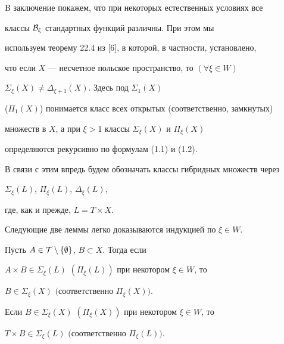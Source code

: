  


B заключение покажем, что при некоторых естественных условиях все 


классы $\cal B_\xi$ стандартных функций различны. При этом мы 


используем теорему 22.4 из [6], в которой, в частности, установлено, 


что если $X$ --- несчетное польское пространство, то $(\forall \xi\in W)$ 


$\Sigma_\xi(X)\ne\Delta_{\xi+1}(X)$. Здесь под $\Sigma_1(X)$ 


($\Pi_1(X)$) понимается класс всех открытых (соответственно, замкнутых) 


множеств в $X$, а при $\xi>1$ классы $\Sigma_\xi(X)$ и $\Pi_\xi(X)$ 


определяются рекурсивно по формулам (1.1) и (1.2). 


 


В связи с этим впредь будем обозначать классы гибридных множеств через 


$\Sigma_\xi(L)$, $\Pi_\xi(L)$, $\Delta_\xi(L)$, 


где, как и прежде, $L=T\times X$. 


 


Следующие две леммы легко доказываются индукцией по $\xi\in W$. 


 


\begin{lems} 


Пусть $A\in\cal T\setminus\{\emptyset\}$, $B\subset X$. Тогда если 


$A\times B\in\Sigma_\xi(L)$ $(\Pi_\xi(L))$ при некотором $\xi\in W$, то 


$B\in\Sigma_\xi(X)$ $($соответственно $\Pi_\xi(X))$. 


\end{lems} 


 


\begin{lems} 


Если $B\in\Sigma_\xi(X)$ $(\Pi_\xi(X))$ при некотором $\xi\in W$, то 


$T\times B\in\Sigma_\xi(L)$ $($соот\-вет\-ст\-вен\-но $\Pi_\xi(L))$. 


\end{lems} 


